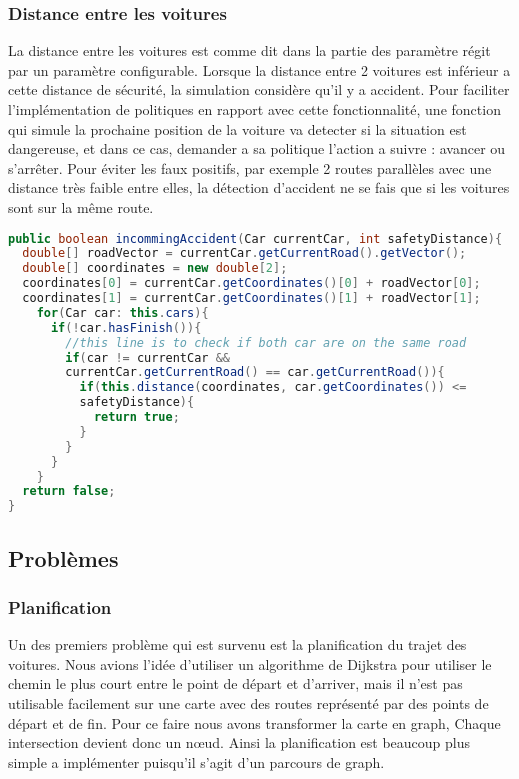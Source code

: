\documentclass[12pt]{article}
\begin{document}
			\subsubsection{Distance entre les voitures}
				La distance entre les voitures est comme dit dans la partie des paramètre régit par un paramètre configurable. Lorsque la distance entre 2 voitures est inférieur a cette distance de sécurité, la simulation considère qu'il y a accident.
				Pour faciliter l'implémentation de politiques en rapport avec cette fonctionnalité, une fonction qui simule la prochaine position de la voiture va detecter si la situation est dangereuse, et dans ce cas, demander a sa politique l'action a suivre : avancer ou s'arrêter.
				Pour éviter les faux positifs, par exemple 2 routes parallèles avec une distance très faible entre elles, la détection d'accident ne se fais que si les voitures sont sur la même route.
				\begin{lstlisting}[language=Java, title="detection situation dangereuse"]
public boolean incommingAccident(Car currentCar, int safetyDistance){
  double[] roadVector = currentCar.getCurrentRoad().getVector();
  double[] coordinates = new double[2];
  coordinates[0] = currentCar.getCoordinates()[0] + roadVector[0];
  coordinates[1] = currentCar.getCoordinates()[1] + roadVector[1];
	for(Car car: this.cars){
	  if(!car.hasFinish()){
	    //this line is to check if both car are on the same road
        if(car != currentCar && 
        currentCar.getCurrentRoad() == car.getCurrentRoad()){
  		  if(this.distance(coordinates, car.getCoordinates()) <= 
  		  safetyDistance){
            return true;
		  }
		}
	  }
	}
  return false;
}		
	\end{lstlisting}
		
		\subsection{Problèmes}
			\subsubsection{Planification}
				Un des premiers problème qui est survenu est la planification du trajet des voitures. Nous avions l'idée d'utiliser un algorithme de Dijkstra pour utiliser le chemin le plus court entre le point de départ et d'arriver, mais il n'est pas utilisable facilement sur une carte avec des routes représenté par des points de départ et de fin. Pour ce faire nous avons transformer la carte en graph, Chaque intersection devient donc un nœud. Ainsi la planification est beaucoup plus simple a implémenter puisqu'il s'agit d'un parcours de graph.
\end{document}
